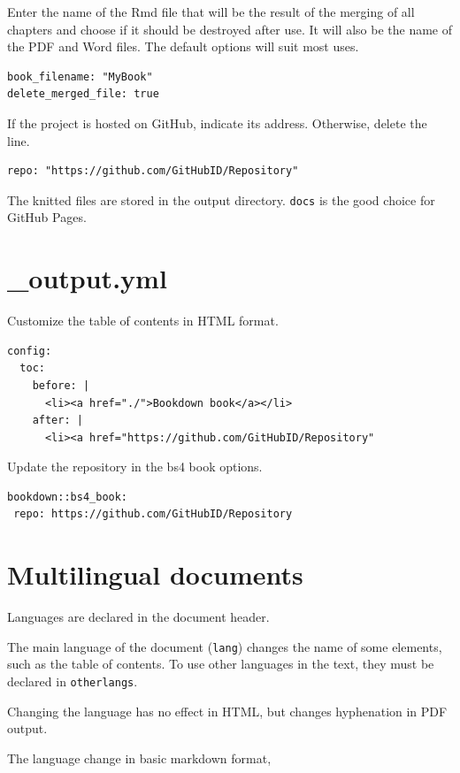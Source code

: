 \documentclass[
  12pt,
  american,
  a4paper,
  extrafontsizes,onecolumn,openright
  ]{memoir}
\begin{document}
Enter the name of the Rmd file that will be the result of the merging of all chapters and choose if it should be destroyed after use.
It will also be the name of the PDF and Word files.
The default options will suit most uses.

\begin{verbatim}
book_filename: "MyBook"
delete_merged_file: true
\end{verbatim}

If the project is hosted on GitHub, indicate its address.
Otherwise, delete the line.

\begin{verbatim}
repo: "https://github.com/GitHubID/Repository"
\end{verbatim}

The knitted files are stored in the output directory.
\texttt{docs} is the good choice for GitHub Pages.

\section{\_output.yml}\label{output.yml}

Customize the table of contents in HTML format.

\begin{verbatim}
config:
  toc:
    before: |
      <li><a href="./">Bookdown book</a></li>
    after: |
      <li><a href="https://github.com/GitHubID/Repository"
\end{verbatim}

Update the repository in the bs4 book options.

\begin{verbatim}
bookdown::bs4_book:
 repo: https://github.com/GitHubID/Repository
\end{verbatim}

\section{Multilingual documents}\label{multilingual-documents}

Languages are declared in the document header.

The main language of the document (\texttt{lang}) changes the name of some elements, such as the table of contents.
To use other languages in the text, they must be declared in \texttt{otherlangs}.

Changing the language has no effect in HTML, but changes hyphenation in PDF output.

The language change in basic markdown format,
\end{document}
